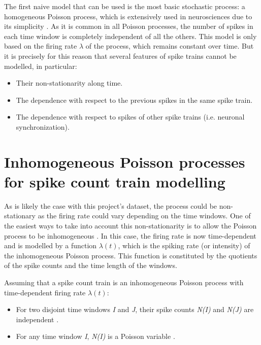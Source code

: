 \documentclass{kththesis}
\begin{document}
The first naive model that can be used is the most basic stochastic process: a homogeneous Poisson process, which is extensively used in neurosciences due to its simplicity \parencite{Gerstner}. 
As it is common in all Poisson processes, the number of spikes in each time window is completely independent of all the others. 
This model is only based on the firing rate \begin{math}\lambda\end{math} of the process, which remains constant over time. 
But it is precisely for this reason that several features of spike trains cannot be modelled, in particular: 

\begin{itemize}
    \item Their non-stationarity along time.
    \item The dependence with respect to the previous spikes in the same spike train.
    \item The dependence with respect to spikes of other spike trains (i.e. neuronal synchronization).
\end{itemize}

\section{Inhomogeneous Poisson processes for spike count train modelling}

As is likely the case with this project's dataset, the process could be non-stationary as the firing rate could vary depending on the time windows. 
One of the easiest ways to take into account this non-stationarity is to allow the Poisson process to be inhomogeneous \parencite{Eden}. 
In this case, the firing rate is now time-dependent and is modelled by a function \begin{math}\lambda(t)\end{math}, which is the spiking rate (or intensity) of the inhomogeneous Poisson process. 
This function is constituted by the quotients of the spike counts and the time length of the windows.

Assuming that a spike count train is an inhomogeneous Poisson process with time-dependent firing rate \begin{math}\lambda(t)\end{math}:

\begin{itemize}
    \item For two disjoint time windows \textit{I} and \textit{J}, their spike counts \textit{N(I)} and \textit{N(J)} are independent \parencite{Nenadic}.
    \item For any time window \textit{I}, \textit{N(I)} is a Poisson variable \parencite{Nenadic}.
\end{itemize}
\end{document}
